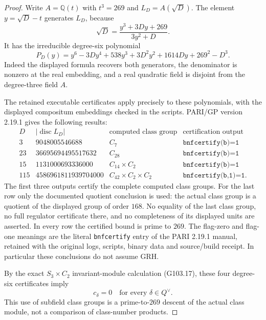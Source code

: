 \begin{proof}
Write $A=\mathbb Q(t)$ with $t^3=269$ and
$L_D=A(\sqrt D)$.
The element $y=\sqrt D-t$ generates $L_D$, because
\[
       \sqrt D=\frac{y^3+3Dy+269}{3y^2+D}.
\]
It has the irreducible degree-six polynomial
\[
 P_D(y)=y^6-3Dy^4+538y^3+3D^2y^2+1614Dy+269^2-D^3.
                                                        \tag{G103C.12}
\]
Indeed the displayed formula recovers both generators, the
denominator is nonzero at the real embedding, and a real quadratic
field is disjoint from the degree-three field $A$.

The retained executable certificates apply precisely to these
polynomials, with the displayed compositum embeddings checked in
the scripts.  PARI/GP version 2.19.1 gives the following results:
\[
\begin{array}{c|c|c|c}
 D&|\operatorname{disc}L_D|&\text{computed class group}
      &\text{certification output}\\ \hline
 3&9048005546688&C_7&\texttt{bnfcertify(b)=1}\\
 23&36695694495517632&C_{28}&\texttt{bnfcertify(b)=1}\\
 15&1131000693336000&C_{14}\times C_2&\texttt{bnfcertify(b)=1}\\
 115&4586961811939704000&C_{42}\times C_2\times C_2
          &\texttt{bnfcertify(b,1)=1}.
\end{array}                                           \tag{G103C.13}
\]
The first three outputs certify the complete computed class groups.
For the last row only the documented quotient conclusion is used:
the actual class group is a quotient of the displayed group of
order $168$.  No equality of the last class group, no full regulator
certificate there, and no completeness of its displayed units are
asserted.  In every row the certified bound is prime to $269$.
The flag-zero and flag-one meanings are the literal
\texttt{bnfcertify} entry of the PARI 2.19.1 manual, retained with
the original logs, scripts, binary data and source/build receipt.
In particular these conclusions do not assume GRH.

By the exact $S_3\times C_2$ invariant-module calculation (G103.17),
these four degree-six certificates imply
\[
                         c_\delta=0
            \quad\text{for every }\delta\in Q^\vee.   \tag{G103C.14}
\]
This use of subfield class groups is a prime-to-$269$ descent of
the actual class module, not a comparison of class-number products.


\end{proof}
